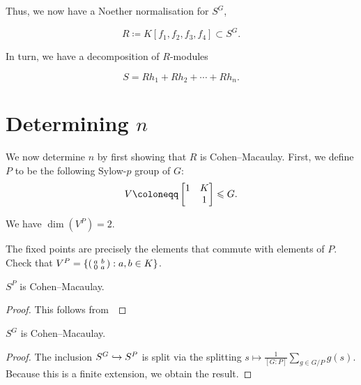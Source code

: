 \documentclass[12pt]{article}
\begin{document}
	Thus, we now have a Noether normalisation for $S^{G}$,
	\begin{tcolorbox}
		\begin{equation*} 
			R \coloneqq K[f_{1}, f_{2}, f_{3}, f_{4}] \subset S^{G}.
		\end{equation*}
	\end{tcolorbox}

	In turn, we have a decomposition of $R$-modules
	\begin{tcolorbox}
		\begin{equation*} 
			S = R h_{1} + R h_{2} + \cdots + R h_{n}.
		\end{equation*}
	\end{tcolorbox}

\section{Determining \texorpdfstring{$n$}{n}}

	We now determine $n$ by first showing that $R$ is Cohen--Macaulay. 
	First, we define $P$ to be the following Sylow-$p$ group of $G$:
	\begin{equation*} 
		V \coloneqq \two{1}{K}{}{1} \le G.
	\end{equation*}

	\begin{lem} 
		We have $\dim(V^{P}) = 2$.
	\end{lem}
	\begin{sketch}
		The fixed points are precisely the elements that commute with elements of $P$.
		Check that $V^{P} = \left\{\left(\begin{smallmatrix} a & b \\ 0 & a \end{smallmatrix}\right) : a, b \in K\right\}$.
	\end{sketch}

	\begin{cor}
		$S^{P}$ is Cohen--Macaulay.
	\end{cor}
	\begin{proof} 
		This follows from~\Cite[Theorem 3.9.2]{CampbellWehlau:ModularInvariantTheory}
	\end{proof}

	\begin{cor}
		$S^{G}$ is Cohen--Macaulay.
	\end{cor}
	\begin{proof} 
		The inclusion $S^{G} \hookrightarrow S^{P}$ is split via the splitting $s \mapsto \frac{1}{[G : P]} \sum_{g \in G/P} g(s)$. 
		Because this is a finite extension, we obtain the result.
	\end{proof}
\end{document}
